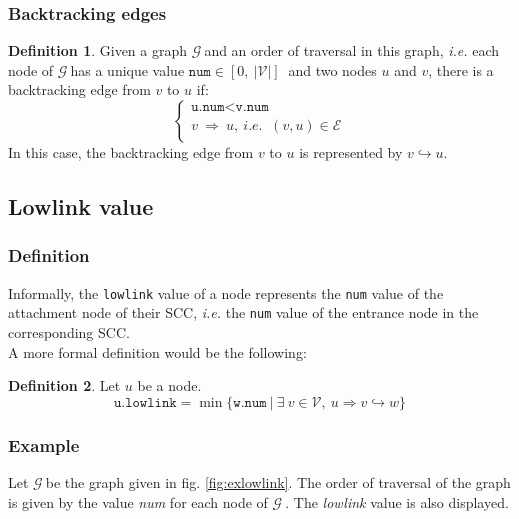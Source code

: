 \documentclass[a4 paper, 12pt]{article}
\theoremstyle{definition}
\def\GG{$\mathcal{G}~$}
\newtheorem{definition}{Definition}
\begin{document}
\subsubsection{Backtracking edges}
\begin{definition}
    Given a graph \GG and an order of traversal in this graph, \textit{i.e.} each node of \GG has a unique value $\texttt{num} \in [0,~|\mathcal{V}|]~$ and two nodes $u$ and $v$, there is a backtracking edge from $v$ to $u$ if:
    \begin{equation*}
        \left\{
            \begin{array}{l}
                \texttt{u.num} < \texttt{v.num}\\
                v~\Rightarrow~u,~\textit{i.e. }~(v, u) \in \mathcal{E}\\
            \end{array}
        \right.
    \end{equation*}
    In this case, the backtracking edge from $v$ to $u$ is represented by $v \hookrightarrow u$.\\      
\end{definition}


\subsection{Lowlink value}
\subsubsection{Definition}
Informally, the \texttt{lowlink} value of a node represents the \texttt{num} value of the attachment node of their SCC, \textit{i.e.} the \texttt{num} value of the entrance node in the corresponding SCC.\\

A more formal definition would be the following:
\begin{definition}
    Let $u$ be a node.
    \begin{equation*}
        \texttt{u.lowlink} = \min \{\texttt{w.num}~|~\exists~v\in \mathcal{V},~u \Rightarrow v \hookrightarrow w\}
    \end{equation*}
\end{definition}

\subsubsection{Example}
Let \GG be the graph given in fig. \ref{fig:exlowlink}. The order of traversal of the graph is given by the value \textit{num} for each node of \GG. The \textit{lowlink} value is also displayed.
\end{document}

